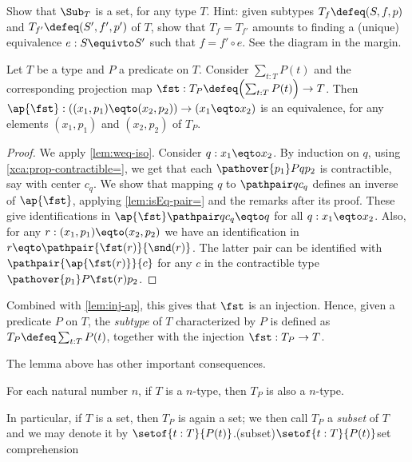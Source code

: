\begin{xca}\label{xca:subtypes-set}
Show that $\Sub_T$ is a set, for any type $T$. Hint:
given subtypes $T_f\defeq(S,f,p)$ and $T_{f'}\defeq(S',f',p')$ of $T$,
show that $T_f=T_{f'}$ amounts to finding a (unique) equivalence%
\marginnote{%
    \[
      \begin{tikzcd}[ampersand replacement=\&]
        S \ar[rr,"{e}","{\sim}"']\ar[dr,"{f}"'] \& \& S'\ar[dl,"{f'}"] \\
        \& T \&
      \end{tikzcd}
    \]}
$e: S\equivto S'$ such that $f = f'\circ e$. See the diagram in the margin.
\end{xca}

\begin{lemma}\label{lem:subtype-eq-=}
  Let $T$ be a type and $P$ a predicate on $T$.
  Consider $\sum_{t:T}P(t)$ and the corresponding projection map
  $\fst : T_P \defeq \Bigl(\sum_{t:T}P(t)\Bigr) \to T$.
  Then $\ap{\fst}: ((x_1,p_1) \eqto (x_2,p_2)) \to (x_1 \eqto x_2)$ is an equivalence,
  for any elements $(x_1,p_1)$ and $(x_2,p_2)$ of $T_P$.
\end{lemma}

\begin{proof}
We apply \cref{lem:weq-iso}. Consider $q: x_1 \eqto x_2$.
By induction on $q$, using \cref{xca:prop-contractible=},
we get that each $\pathover {p_1} P q {p_2}$ is contractible,
say with center $c_q$. We show that
mapping $q$ to $\pathpair q {c_q}$ defines an inverse of $\ap{\fst}$,
applying \cref{lem:isEq-pair=} and the remarks after its proof.
These give identifications in $\ap{\fst}\pathpair q {c_q} \eqto q$
for all $q: x_1 \eqto x_2$.
Also, for any $r: (x_1,p_1) \eqto (x_2,p_2)$ we have an identification
in $r \eqto \pathpair{\fst(r)}{\snd(r)}$.
The latter pair can be identified with
$\pathpair{\ap{\fst(r)}}{c}$ for any $c$
in the contractible type $\pathover {p_1} P {\fst(r)} {p_2}$.
\end{proof}

Combined with \cref{lem:inj-ap},
this gives that $\fst$ is an injection.
Hence, given a predicate $P$ on $T$,
the \emph{subtype} of $T$ characterized by $P$ is defined
as $T_P\defeq \sum_{t:T} P(t)$,
together with the injection $\fst : T_P \to T$.

The lemma above has other important consequences.
\begin{corollary}\label{cor:subtype-same-level}
  For each natural number $n$,
  if $T$ is a $n$-type, then $T_P$ is also a $n$-type.
\end{corollary}
In particular, if $T$ is a set, then $T_P$ is again a set;
we then call $T_P$ a \emph{subset} of $T$ and we may denote it by
$\setof{t:T}{P(t)}$.\glossary(subset){$\setof{t:T}{P(t)}$}{set comprehension}

